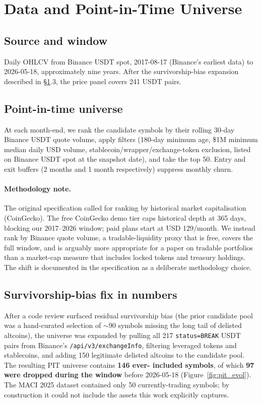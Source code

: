 \documentclass[11pt,a4paper]{article}
\begin{document}
\section{Data and Point-in-Time Universe}
\label{sec:data}

\subsection{Source and window}
Daily OHLCV from Binance USDT spot, 2017-08-17 (Binance's earliest
data) to 2026-05-18, approximately nine years. After the
survivorship-bias expansion described in \S\ref{sec:data}.3, the price
panel covers 241 USDT pairs.

\subsection{Point-in-time universe}
At each month-end, we rank the candidate symbols by their rolling
30-day Binance USDT quote volume, apply filters (180-day minimum age,
\$1M minimum median daily USD volume, stablecoin/wrapper/exchange-token
exclusion, listed on Binance USDT spot at the snapshot date), and take
the top 50. Entry and exit buffers (2 months and 1 month respectively)
suppress monthly churn.

\paragraph{Methodology note.} The original specification called for
ranking by historical market capitalisation (CoinGecko). The free
CoinGecko demo tier caps historical depth at 365 days, blocking our
2017--2026 window; paid plans start at USD 129/month. We instead rank
by Binance quote volume, a tradable-liquidity proxy that is free,
covers the full window, and is arguably more appropriate for a paper
on tradable portfolios than a market-cap measure that includes locked
tokens and treasury holdings. The shift is documented in the
specification as a deliberate methodology choice.

\subsection{Survivorship-bias fix in numbers}
After a code review surfaced residual survivorship bias (the prior
candidate pool was a hand-curated selection of $\sim$90 symbols missing
the long tail of delisted altcoins), the universe was expanded by
pulling all 217 \texttt{status=BREAK} USDT pairs from Binance's
\texttt{/api/v3/exchangeInfo}, filtering leveraged tokens and
stablecoins, and adding 150 legitimate delisted altcoins to the
candidate pool. The resulting PIT universe contains \textbf{146 ever-
included symbols}, of which \textbf{97 were dropped during the window}
before 2026-05-18 (Figure~\ref{fig:pit_evol}). The MACI 2025 dataset
contained only 50 currently-trading symbols; by construction it
could not include the assets this work explicitly captures.
\end{document}
